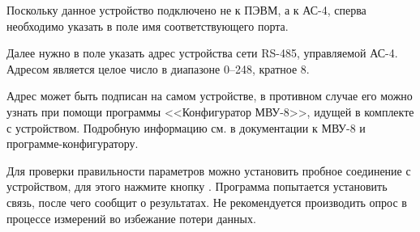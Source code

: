 Поскольку данное устройство подключено не к ПЭВМ, а к АС-4, сперва необходимо указать в поле  имя соответствующего порта.

Далее нужно в поле  указать адрес устройства сети RS-485, управляемой АС-4. Адресом является целое число в диапазоне 0--248, кратное 8.

Адрес может быть подписан на самом устройстве, в противном случае его можно узнать при помощи программы <<Конфигуратор МВУ-8>>, идущей в комплекте с устройством. Подробную информацию см. в документации к МВУ-8 и программе-конфигуратору.


\bigskip

Для проверки правильности параметров можно установить пробное соединение с устройством, для этого нажмите кнопку . Программа попытается установить связь, после чего сообщит о результатах. Не рекомендуется производить опрос в процессе измерений во избежание потери данных.